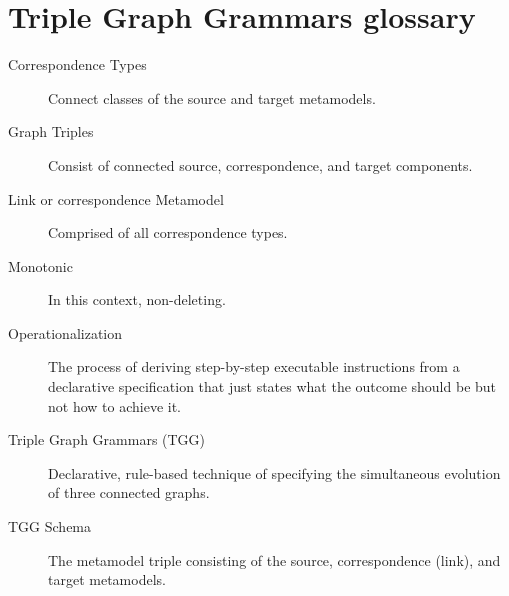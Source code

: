 \newpage
\chapter{Triple Graph Grammars glossary}

\begin{description}

\item[Correspondence Types] Connect classes of the source and target metamodels.

\item[Graph Triples] Consist of connected source, correspondence, and target components.

\item[Link or correspondence Metamodel] Comprised of all correspondence types.

\item[Monotonic] In this context, non-deleting.

\item[Operationalization] The process of deriving step-by-step executable instructions from a declarative specification that just states what the outcome should
be but not how to achieve it.

\item[Triple Graph Grammars (TGG)] Declarative, rule-based technique of specifying the simultaneous evolution of three connected graphs.

\item[TGG Schema] The metamodel triple consisting of the source, correspondence (link), and target metamodels.

\end{description}